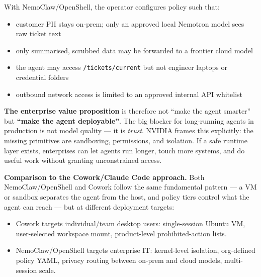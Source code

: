 With NemoClaw/OpenShell, the operator configures policy such that:
\begin{itemize}
  \item customer PII stays on-prem; only an approved local Nemotron model sees raw
    ticket text
  \item only summarised, scrubbed data may be forwarded to a frontier cloud model
  \item the agent may access \texttt{/tickets/current} but not engineer laptops or
    credential folders
  \item outbound network access is limited to an approved internal API whitelist
\end{itemize}

\textbf{The enterprise value proposition} is therefore not ``make the agent smarter''
but \textbf{``make the agent deployable''}. The big blocker for long-running agents in
production is not model quality --- it is \emph{trust}. NVIDIA frames this explicitly:
the missing primitives are sandboxing, permissions, and isolation. If a safe runtime
layer exists, enterprises can let agents run longer, touch more systems, and do useful
work without granting unconstrained access.

\textbf{Comparison to the Cowork/Claude Code approach.}
Both NemoClaw/OpenShell and Cowork follow the same fundamental pattern --- a VM or
sandbox separates the agent from the host, and policy tiers control what the agent can
reach --- but at different deployment targets:
\begin{itemize}
  \item Cowork targets individual/team desktop users: single-session Ubuntu VM,
    user-selected workspace mount, product-level prohibited-action lists.
  \item NemoClaw/OpenShell targets enterprise IT: kernel-level isolation, org-defined
    policy YAML, privacy routing between on-prem and cloud models, multi-session scale.
\end{itemize}

